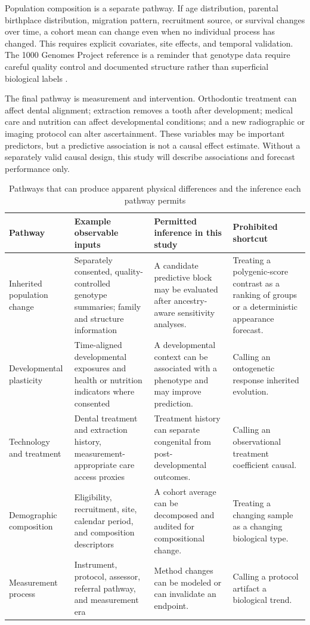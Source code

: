 \documentclass[conference]{IEEEtran}
\begin{document}
Population composition is a separate pathway. If age distribution, parental
birthplace distribution, migration pattern, recruitment source, or survival
changes over time, a cohort mean can change even when no individual process
has changed. This requires explicit covariates, site effects, and temporal
validation. The 1000 Genomes Project reference is a reminder that genotype
data require careful quality control and documented structure rather than
superficial biological labels \cite{auton2015}.

The final pathway is measurement and intervention. Orthodontic treatment can
affect dental alignment; extraction removes a tooth after development; medical
care and nutrition can affect developmental conditions; and a new radiographic
or imaging protocol can alter ascertainment. These variables may be important
predictors, but a predictive association is not a causal effect estimate.
Without a separately valid causal design, this study will describe
associations and forecast performance only.

\begin{table}[t]
\caption{Pathways that can produce apparent physical differences and the
inference each pathway permits}
\label{tab:pathways}
\centering
\footnotesize
\begin{tabular}{p{}p{}p{}p{}}
\toprule
Pathway & Example observable inputs & Permitted inference in this study & Prohibited shortcut \\
\midrule
Inherited population change & Separately consented, quality-controlled genotype summaries; family and structure information & A candidate predictive block may be evaluated after ancestry-aware sensitivity analyses. & Treating a polygenic-score contrast as a ranking of groups or a deterministic appearance forecast. \\
Developmental plasticity & Time-aligned developmental exposures and health or nutrition indicators where consented & A developmental context can be associated with a phenotype and may improve prediction. & Calling an ontogenetic response inherited evolution. \\
Technology and treatment & Dental treatment and extraction history, measurement-appropriate care access proxies & Treatment history can separate congenital from post-developmental outcomes. & Calling an observational treatment coefficient causal. \\
Demographic composition & Eligibility, recruitment, site, calendar period, and composition descriptors & A cohort average can be decomposed and audited for compositional change. & Treating a changing sample as a changing biological type. \\
Measurement process & Instrument, protocol, assessor, referral pathway, and measurement era & Method changes can be modeled or can invalidate an endpoint. & Calling a protocol artifact a biological trend. \\
\bottomrule
\end{tabular}
\end{table}
\end{document}
